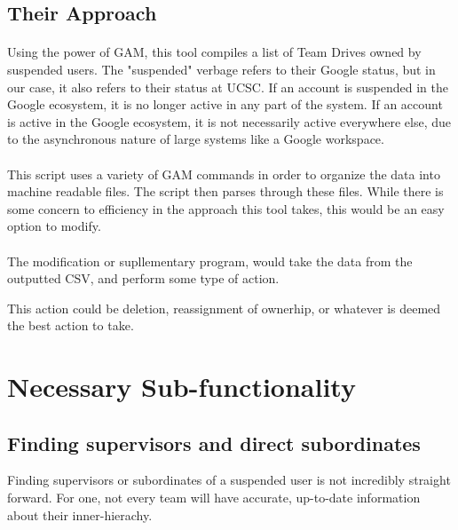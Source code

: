 \documentclass{article}
\begin{document}
\subsection*{Their Approach}
\begin{tcolorbox}
    \paragraph{}Using the power of GAM, this tool compiles a list of Team Drives owned by suspended users.
    The "suspended" verbage refers to their Google status, but in our case, it also refers to their
    status at UCSC. If an account is suspended in the Google ecosystem, it is no longer active in any part of the system.
    If an account is active in the Google ecosystem, it is not necessarily active everywhere else, due to the asynchronous nature of
    large systems like a Google workspace.

        
    \paragraph{}This script uses a variety of GAM commands in order to organize the data into
    machine readable files. The script then parses through these files. While there is some concern to efficiency in the approach this tool takes,
    this would be an easy option to modify.

    \paragraph{}The modification or supllementary program, would take the data from the outputted CSV, and perform some type of action.

    This action could be deletion, reassignment of ownerhip, or whatever is deemed the best action to take.
\end{tcolorbox}


\newpage
\section{Necessary Sub-functionality}
\subsection*{Finding supervisors and direct subordinates}
Finding supervisors or subordinates of a suspended user is not incredibly straight forward.
For one, not every team will have accurate, up-to-date information about their inner-hierachy.
\end{document}

